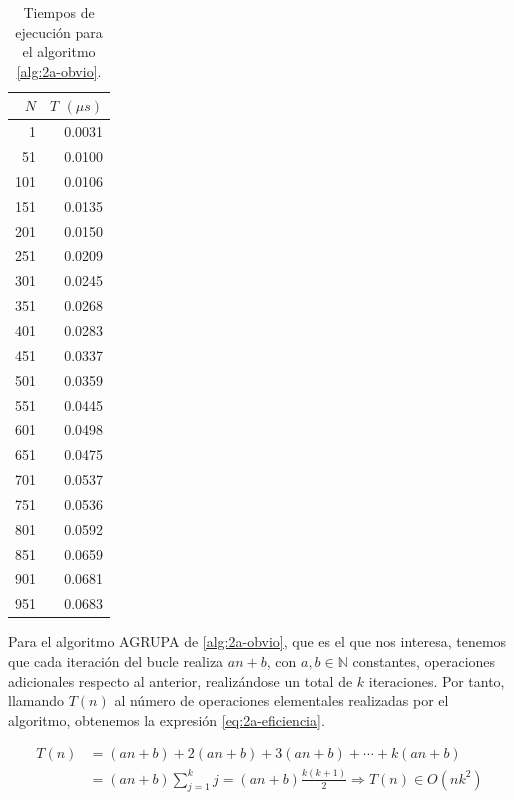 \begin{table}
    \footnotesize
    \centering
    \begin{tabular}{|r|r|}
        \hline
        $N$ & $T$ $(\mu s)$ \\
        \hline
        1 & 0.0031 \\ 
        51 & 0.0100 \\ 
        101 & 0.0106 \\ 
        151 & 0.0135 \\ 
        201 & 0.0150 \\ 
        251 & 0.0209 \\ 
        301 & 0.0245 \\ 
        351 & 0.0268 \\ 
        401 & 0.0283 \\ 
        451 & 0.0337 \\ 
        501 & 0.0359 \\ 
        551 & 0.0445 \\ 
        601 & 0.0498 \\ 
        651 & 0.0475 \\ 
        701 & 0.0537 \\ 
        751 & 0.0536 \\ 
        801 & 0.0592 \\ 
        851 & 0.0659 \\ 
        901 & 0.0681 \\ 
        951 & 0.0683 \\ 
        \hline
    \end{tabular}
    \caption{Tiempos de ejecución para el algoritmo \ref{alg:2a-obvio}.}
    \label{tab:2a-obvio-n}
\end{table}

Para el algoritmo AGRUPA de \ref{alg:2a-obvio}, que es el que nos interesa,
tenemos que cada iteración del bucle realiza $an + b$, con $a,b \in \mathbb N$ constantes,
operaciones adicionales respecto al anterior,
realizándose un total de $k$ iteraciones. Por tanto, llamando $T(n)$ al número de
operaciones elementales realizadas por el algoritmo, obtenemos la 
expresión \ref{eq:2a-eficiencia}. 

\begin{equation} \label{eq:2a-eficiencia}
    \begin{split}
        T(n) & = (an + b) + 2(an + b) + 3(an + b) + \cdots + k(an + b) \\
             & = (an + b)\sum_{j=1}^k j = (an + b) \frac{k(k+1)}{2} \Rightarrow \boxed{T(n) \in O(nk^2)}
    \end{split}
\end{equation}

